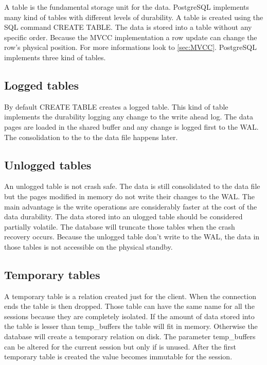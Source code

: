 A table is the fundamental storage unit for the data. PostgreSQL implements many kind of tables
with different levels of durability. A table is created using the SQL command CREATE TABLE. The data
is stored into a table without any specific order. Because the MVCC implementation a row update can
change the row's physical position. For more informations look to \ref{sec:MVCC}. PostgreSQL
implements three kind of tables.

\subsection{Logged tables}
By default CREATE TABLE creates a logged table. This kind of table implements the durability
logging any change to the write ahead log. The data pages are loaded in the shared buffer and any
change is logged first to the WAL. The consolidation to the to the data file happens later. 

\subsection{Unlogged tables}
\label{sub:UNLOGGEDTABLES}
An unlogged table is not crash safe. The data is still consolidated to the data file but the pages
modified in memory do not write their changes to the WAL. The main advantage is the write operations
are considerably faster at the cost of the data durability. The data stored into an ulogged table
should be considered partially volatile. The database will truncate those tables when the crash
recovery occurs. Because the unlogged table don't write to the WAL, the data in those tables is not
accessible on the physical standby. 


\subsection{Temporary tables}
A temporary table is a relation created just for the client. When the connection ends the table is
then dropped. Those table can have the same name for all the sessions because they are completely
isolated. If the amount of data stored into the table is lesser than temp\_buffers the table will
fit in memory. Otherwise the database will create a temporary relation on disk. The parameter
temp\_buffers can be altered for the current session but only if is unused. After the first
temporary table is created the value becomes immutable for the session.


